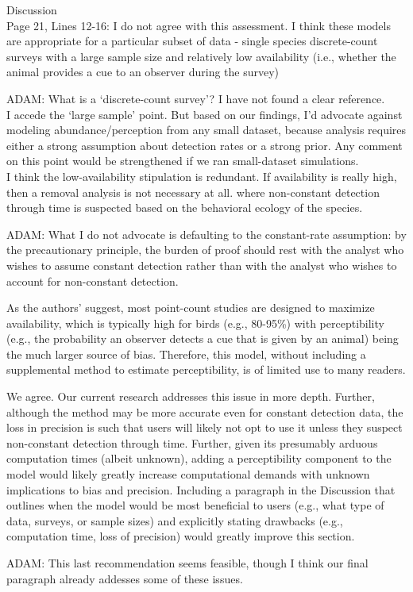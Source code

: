 \documentclass[12pt]{article}
\renewenvironment{quote}  %
              {\list{}{\rightmargin\leftmargin}\normalfont%
               \item\relax}
              {\endlist}
\newcommand{\adam}[1]{{\color{blue} ADAM: #1}}
\begin{document}
Discussion\\
Page 21, Lines 12-16:  I do not agree with this assessment.  I think these models are appropriate for a particular subset of data - single species discrete-count surveys with a large sample size and relatively low availability (i.e., whether the animal provides a cue to an observer during the survey)   
\begin{quote}
\adam{What is a `discrete-count survey'?  I have not found a clear reference.\\
I accede the `large sample' point.  But based on our findings, I'd advocate against modeling abundance/perception from any small dataset, because analysis requires either a strong assumption about detection rates or a strong prior.  Any comment on this point would be strengthened if we ran small-dataset simulations.\\
I think the low-availability stipulation is redundant.  If availability is really high, then a removal analysis is not necessary at all.}
\end{quote}
where non-constant detection through time is suspected based on the behavioral ecology of the species.
\begin{quote}
\adam{What I do not advocate is defaulting to the constant-rate assumption: by the precautionary principle, the burden of proof should rest with the analyst who wishes to assume constant detection rather than with the analyst who wishes to account for non-constant detection.}
\end{quote}


As the authors’ suggest, most point-count studies are designed to maximize availability, which is typically high for birds (e.g., 80-95\%) with perceptibility (e.g., the probability an observer detects a cue that is given by an animal) being the much larger source of bias.  Therefore, this model, without including a supplemental method to estimate perceptibility, is of limited use to many readers.
\begin{quote}
We agree.  Our current research addresses this issue in more depth.
\end{quote}
Further, although the method may be more accurate even for constant detection data, the loss in precision is such that users will likely not opt to use it unless they suspect non-constant detection through time.  Further, given its presumably arduous computation times (albeit unknown), adding a perceptibility component to the model would likely greatly increase computational demands with unknown implications to bias and precision.  Including a paragraph in the Discussion that outlines when the model would be most beneficial to users (e.g., what type of data, surveys, or sample sizes) and explicitly stating drawbacks (e.g., computation time, loss of precision) would greatly improve this section.  
\begin{quote}
\adam{This last recommendation seems feasible, though I think our final paragraph already addesses some of these issues.}
\end{quote}
\vspace{1.5cm}
\end{document}
